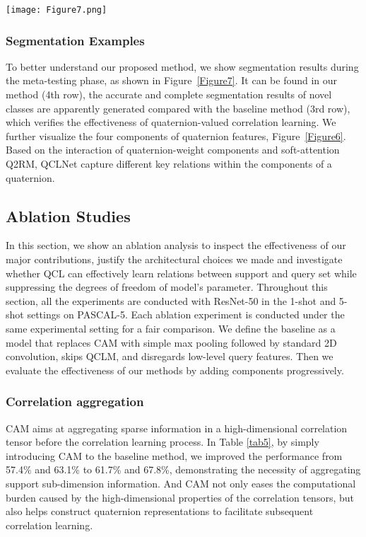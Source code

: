 \documentclass[lettersize,journal]{IEEEtran}
\begin{document}
\begin{figure*}
\centering
\texttt{[image: Figure7.png]}
\caption{Segmentation results of the proposed QCLNet and the baseline. From top to bottom: (a) support image, (b) support mask, (c) ground truth of query image, (d) predictions of baseline, (e) predictions of QCLNet.
\label{Figure7}}
\end{figure*}

\subsubsection{Segmentation Examples}
To better understand our proposed method, we show segmentation results during the meta-testing phase, as shown in Figure~\ref{Figure7}. It can be found in our method (4th row), the accurate and complete segmentation results of novel classes are apparently generated compared with the baseline method (3rd row), which verifies the effectiveness of quaternion-valued correlation learning. We further visualize the four components of quaternion features, Figure~\ref{Figure6}. Based on the interaction of quaternion-weight components and soft-attention Q2RM, QCLNet capture different key relations within the components of a quaternion.

\subsection{Ablation Studies}
In this section, we show an ablation analysis to inspect the effectiveness of our major contributions, justify the architectural choices we made and investigate whether QCL can effectively learn relations between support and query set while suppressing the degrees of freedom of model's parameter. Throughout this section, all the experiments are conducted with ResNet-50 in the 1-shot and 5-shot settings on PASCAL-5. Each ablation experiment is conducted under the same experimental setting for a fair comparison. We define the baseline as a model that replaces CAM with simple max pooling followed by standard 2D convolution, skips QCLM,  and disregards low-level query features. Then we evaluate the effectiveness of our methods by adding components progressively.

\subsubsection{Correlation aggregation}
CAM aims at aggregating sparse information in a high-dimensional correlation tensor before the correlation learning process. In Table \ref{tab5}, by simply introducing CAM to the baseline method, we improved the performance from 57.4\% and 63.1\% to 61.7\% and 67.8\%, demonstrating the necessity of aggregating support sub-dimension information. And CAM not only eases the computational burden caused by the high-dimensional properties of the correlation tensors, but also helps construct quaternion representations to facilitate subsequent correlation learning. 
\end{document}
